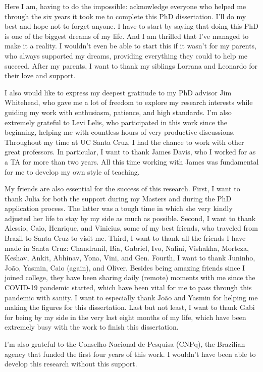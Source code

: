 Here I am, having to do the impossible: acknowledge everyone who helped me through the six years it took me to complete this PhD dissertation. I'll do my best and hope not to forget anyone. I have to start by saying that doing this PhD is one of the biggest dreams of my life. And I am thrilled that I've managed to make it a reality. I wouldn't even be able to start this if it wasn't for my parents, who always supported my dreams, providing everything they could to help me succeed. After my parents, I want to thank my siblings Lorrana and Leonardo for their love and support.

I also would like to express my deepest gratitude to my PhD advisor Jim Whitehead, who gave me a lot of freedom to explore my research interests while guiding my work with enthusiasm, patience, and high standards. I'm also extremely grateful to Levi Lelis, who participated in this work since the beginning, helping me with countless hours of very productive discussions. Throughout my time at UC Santa Cruz, I had the chance to work with other great professors. In particular, I want to thank James Davis, who I worked for as a TA for more than two years. All this time working with James was fundamental for me to develop my own style of teaching.

My friends are also essential for the success of this research. First, I want to thank Julia for both the support during my Masters and during the PhD application process. The latter was a tough time in which she very kindly adjusted her life to stay by my side as much as possible. Second, I want to thank  Alessio, Caio, Henrique, and Vinicius, some of my best friends, who traveled from Brazil to Santa Cruz to visit me. Third, I want to thank all the friends I have made in Santa Cruz: Chandranil, Bia, Gabriel, Ivo, Nalini, Vishakha, Morteza, Keshav, Ankit, Abhinav, Yona, Vini, and Gen. Fourth, I want to thank Juninho, Jo\~{a}o, Yasmin, Caio (again), and Oliver. Besides being amazing friends since I joined college, they have been sharing daily (remote) moments with me since the COVID-19 pandemic started, which have been vital for me to pass through this pandemic with sanity. I want to especially thank Jo\~{a}o and Yasmin for helping me making the figures for this dissertation. Last but not least, I want to thank Gabi for being by my side in the very last eight months of my life, which have been extremely busy with the work to finish this dissertation.

I'm also grateful to the Conselho Nacional de Pesquisa (CNPq), the Brazilian agency that funded the first four years of this work. I wouldn't have been able to develop this research without this support.
